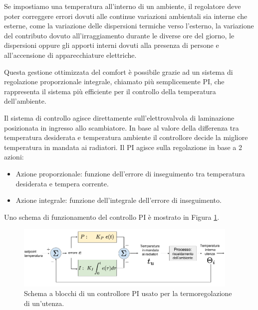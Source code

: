 \documentclass[laurea,oneside,11pt]{USiena_tesiLM}
\begin{document}
Se impostiamo una temperatura all'interno di un ambiente, il regolatore deve poter correggere errori dovuti alle continue variazioni ambientali sia interne che esterne, come la variazione delle dispersioni termiche verso l'esterno, la variazione del contributo dovuto all'irraggiamento durante le diverse ore del giorno, le dispersioni oppure gli apporti interni dovuti alla presenza di persone e all'accensione di apparecchiature elettriche.

Questa gestione ottimizzata  del comfort è possibile grazie ad un sistema di regolazione proporzionale integrale, chiamato più semplicemente PI, che rappresenta il sistema più efficiente per il controllo della temperatura dell'ambiente. 

Il sistema di controllo agisce direttamente sull'elettrovalvola di laminazione posizionata in ingresso allo scambiatore. In base al valore della differenza tra temperatura desiderata e temperatura ambiente il controllore decide la migliore temperatura in mandata ai radiatori. Il PI agisce sulla regolazione in base a 2 azioni:
\begin{itemize}
\item Azione proporzionale: funzione dell'errore di inseguimento tra temperatura desiderata e tempera corrente.
\item  Azione integrale: funzione dell'integrale dell'errore di inseguimento.
\end{itemize}
Uno schema di funzionamento del controllo PI è mostrato in Figura \ref{fig:PI}.

\begin{figure}[!ht]
\centering
\includegraphics[width=0.95\textwidth]{figure/PI} 
\caption{Schema a blocchi di un controllore PI usato per la termoregolazione di un'utenza.}
\label{fig:PI}
\end{figure}
   
\end{document}
